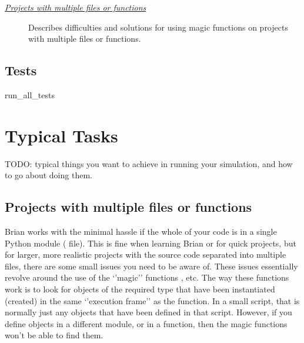 \documentclass[letterpaper,10pt,english]{manual}
\begin{document}

\begin{description}
\item[\hyperlink{projects-with-multiple-files}{\emph{Projects with multiple files or functions}}] \leavevmode
Describes difficulties and solutions for using magic functions
on projects with multiple files or functions.

\end{description}



\resetcurrentobjects
\hypertarget{--doc-reference-tests}{}

\hypertarget{index-114}{}\section{Tests}

\hypertarget{brian.run_all_tests}{}\begin{funcdesc}{run\_all\_tests}{}\end{funcdesc}

\resetcurrentobjects
\hypertarget{--doc-typicaltasks}{}

\chapter{Typical Tasks}

TODO: typical things you want to achieve in running your simulation,
and how to go about doing them.

\resetcurrentobjects
\hypertarget{--doc-tasks_multiplefiles}{}

\hypertarget{projects-with-multiple-files}{}\section{Projects with multiple files or functions}

Brian works with the minimal hassle if the whole of your code is in a
single Python module ( file). This is fine when learning Brian
or for quick projects, but for larger, more realistic projects with
the source code separated into multiple files, there are some small
issues you need to be aware of. These issues essentially revolve
around the use of the `'magic'' functions \hyperlink{brian.run}{}, etc. The way
these functions work is to look for objects of the required type that
have been instantiated (created) in the same `'execution frame'' as
the \hyperlink{brian.run}{} function. In a small script, that is normally just
any objects that have been defined in that script. However, if you
define objects in a different module, or in a function, then the
magic functions won't be able to find them.
\end{document}
